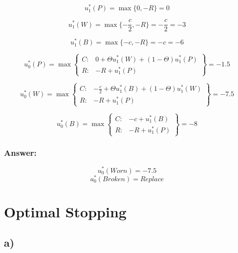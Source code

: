 \documentclass{article}
\begin{document}
\begin{equation}
u_{1}^{*}(P) = \max\{0, -R\} = 0
\end{equation}

\begin{equation}
u_{1}^{*}(W) = \max\{-\frac{c}{2}, -R\} = -\frac{c}{2} = -3
\end{equation}

\begin{equation}
u_{1}^{*}(B) = \max\{-c, -R\} = -c = -6
\end{equation}

\begin{equation}
    u_{0}^{*}(P) = \max
    \left\{\begin{matrix}
    C: & 0 + \Theta u_{1}^{*}(W) + (1 - \Theta)u_{1}^{*}(P) \\
    R: & -R + u_{1}^{*}(P)
    \end{matrix}\right\}
    = -1.5
\end{equation}

\begin{equation}
    u_{0}^{*}(W) = \max
    \left\{\begin{matrix}
    C: & -\frac{c}{2} + \Theta u_{1}^{*}(B) + (1 - \Theta)u_{1}^{*}(W) \\
    R: & -R +  u_{1}^{*}(P)
    \end{matrix}\right\}
    = -7.5
\end{equation}

\begin{equation}
    u_{0}^{*}(B) = \max
    \left\{\begin{matrix}
    C: & -c + u_{1}^{*}(B) \\
    R: & -R + u_{1}^{*}(P)
    \end{matrix}\right\}
    = -8
\end{equation}






\subsubsection*{Answer:}
$$u^*_0(Worn)= -7.5$$
$$a^*_0(Broken)=Replace$$


\section{Optimal Stopping}
\subsection*{a)}
\end{document}
